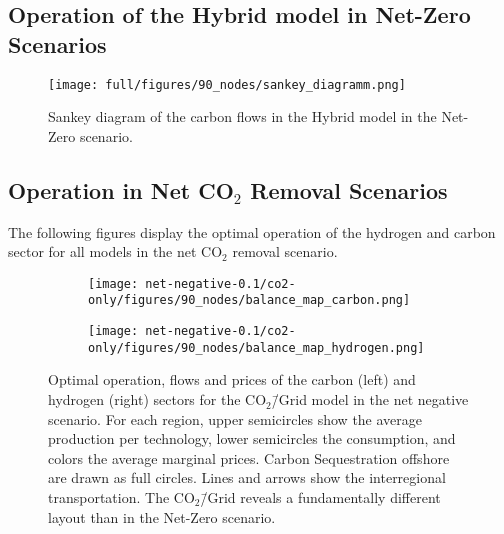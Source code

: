 \documentclass[twocolumn]{article}
\newcommand{\carbon}{CO$_2$}
\newcommand{\carbongrid}{CO$_2$\=/Grid}
\newcommand{\carbonmodel}{CO$_2$\=/Grid model}
\newcommand{\hybridmodel}{Hybrid model}
\begin{document}
\clearpage
\subsection{Operation of the \hybridmodel{} in Net-Zero Scenarios}

\begin{figure}[h!]
    \centering
    \texttt{[image: full/figures/90\_nodes/sankey\_diagramm.png]}
    \caption{Sankey diagram of the carbon flows in the \hybridmodel{} in the Net-Zero scenario.}
    \label{fig:sankey_diagramm}
\end{figure}



\clearpage
\subsection{Operation in Net \carbon{} Removal Scenarios}
The following figures display the optimal operation of the hydrogen and carbon sector for all models in the net \carbon{} removal scenario.

\begin{figure}[ht!]
    \centering
    \begin{subfigure}{.5\textwidth}
        \centering
        \texttt{[image: net-negative-0.1/co2-only/figures/90\_nodes/balance\_map\_carbon.png]}
        \label{fig:balance_map_carbon_co2_nn}
    \end{subfigure}%
    \begin{subfigure}{.5\textwidth}
        \centering
        \texttt{[image: net-negative-0.1/co2-only/figures/90\_nodes/balance\_map\_hydrogen.png]}
        \label{fig:balance_map_hydrogen_co2_nn}
    \end{subfigure}
    \caption{Optimal operation, flows and prices of the carbon (left) and hydrogen (right) sectors for the \carbonmodel{} in the net negative scenario. For each region, upper semicircles show the average production per technology, lower semicircles the consumption, and colors the average marginal prices. Carbon Sequestration offshore are drawn as full circles. Lines and arrows show the interregional transportation. The \carbongrid{} reveals a fundamentally different layout than in the Net-Zero scenario.
    }
    \label{fig:balance_maps_co2_nn}
\end{figure}
\end{document}
